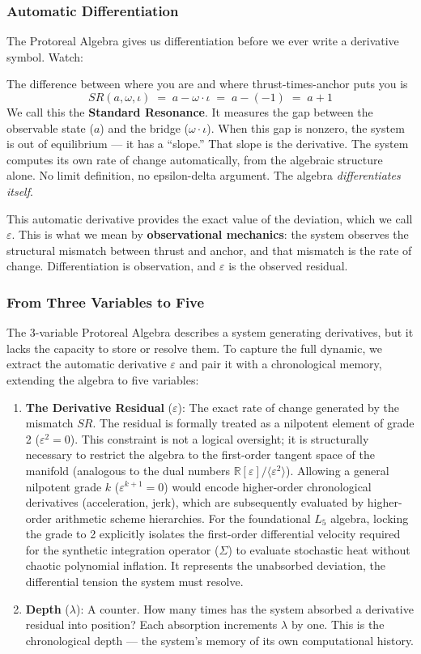\documentclass[12pt,oneside]{article}
\theoremstyle{principia}
\theoremstyle{definition}
\theoremstyle{remark}
\providecommand{\RR}{\mathbb{R}}
\providecommand{\eps}{\varepsilon}
\providecommand{\lam}{\lambda}
\begin{document}
\subsubsection*{Automatic Differentiation}

The Protoreal Algebra gives us differentiation before we ever write a derivative symbol. Watch:

The difference between where you are and where thrust-times-anchor puts you is
$$SR(a, \omega, \iota) \;=\; a - \omega \cdot \iota \;=\; a - (-1) \;=\; a + 1$$
We call this the \textbf{Standard Resonance}. It measures the gap between the observable state ($a$) and the bridge ($\omega \cdot \iota$). When this gap is nonzero, the system is out of equilibrium --- it has a ``slope.'' That slope is the derivative. The system computes its own rate of change automatically, from the algebraic structure alone. No limit definition, no epsilon-delta argument. The algebra \emph{differentiates itself}.

This automatic derivative provides the exact value of the deviation, which we call $\eps$. This is what we mean by \textbf{observational mechanics}: the system observes the structural mismatch between thrust and anchor, and that mismatch is the rate of change. Differentiation is observation, and $\eps$ is the observed residual.

\subsubsection*{From Three Variables to Five}

The 3-variable Protoreal Algebra describes a system generating derivatives, but it lacks the capacity to store or resolve them. To capture the full dynamic, we extract the automatic derivative $\eps$ and pair it with a chronological memory, extending the algebra to five variables:

\begin{enumerate}
\item \textbf{The Derivative Residual} ($\eps$): The exact rate of change generated by the mismatch $SR$. The residual is formally treated as a nilpotent element of grade 2 ($\eps^2 = 0$). This constraint is not a logical oversight; it is structurally necessary to restrict the algebra to the first-order tangent space of the manifold (analogous to the dual numbers $\RR[\eps]/\langle\eps^2\rangle$). Allowing a general nilpotent grade $k$ ($\eps^{k+1} = 0$) would encode higher-order chronological derivatives (acceleration, jerk), which are subsequently evaluated by higher-order arithmetic scheme hierarchies. For the foundational $L_5$ algebra, locking the grade to 2 explicitly isolates the first-order differential velocity required for the synthetic integration operator ($\Sigma$) to evaluate stochastic heat without chaotic polynomial inflation. It represents the unabsorbed deviation, the differential tension the system must resolve. 
\item \textbf{Depth} ($\lam$): A counter. How many times has the system absorbed a derivative residual into position? Each absorption increments $\lam$ by one. This is the chronological depth --- the system's memory of its own computational history.
\end{enumerate}
\end{document}
